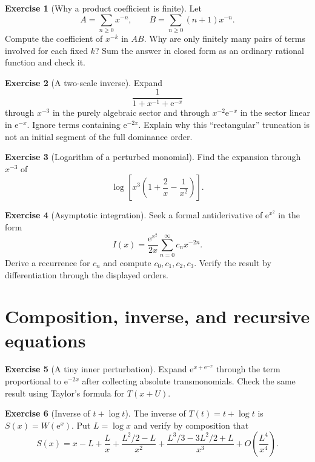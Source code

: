 \documentclass[11pt,oneside]{book}
\theoremstyle{definition}
\newtheorem{exercise}{Exercise}[chapter]
\theoremstyle{remark}
\newcommand{\e}{\mathrm{e}}
\newcommand{\bigO}{O}
\begin{document}
\begin{exercise}[Why a product coefficient is finite]
\label{ex:finite-product}
Let
\[
  A=\sum_{n\ge0}x^{-n},
  \qquad B=\sum_{n\ge0}(n+1)x^{-n}.
\]
Compute the coefficient of $x^{-k}$ in $AB$. Why are only finitely many pairs of
terms involved for each fixed $k$? Sum the answer in closed form as an ordinary
rational function and check it.
\end{exercise}

\begin{exercise}[A two-scale inverse]
\label{ex:two-scale-inverse}
Expand
\[
  \frac1{1+x^{-1}+\e^{-x}}
\]
through $x^{-3}$ in the purely algebraic sector and through
$x^{-2}\e^{-x}$ in the sector linear in $\e^{-x}$. Ignore terms containing
$\e^{-2x}$. Explain why this ``rectangular'' truncation is not an initial segment
of the full dominance order.
\end{exercise}

\begin{exercise}[Logarithm of a perturbed monomial]
\label{ex:log-perturbed}
Find the expansion through $x^{-3}$ of
\[
  \log\!\left[x^3\left(1+\frac2x-\frac1{x^2}\right)\right].
\]
\end{exercise}

\begin{exercise}[Asymptotic integration]
\label{ex:integrate-exp-x2}
Seek a formal antiderivative of $\e^{x^2}$ in the form
\[
  I(x)=\frac{\e^{x^2}}{2x}
  \sum_{n=0}^{\infty}c_nx^{-2n}.
\]
Derive a recurrence for $c_n$ and compute $c_0,c_1,c_2,c_3$. Verify the result by
differentiation through the displayed orders.
\end{exercise}

\section{Composition, inverse, and recursive equations}

\begin{exercise}[A tiny inner perturbation]
\label{ex:tiny-composition}
Expand $\e^{x+\e^{-x}}$ through the term proportional to $\e^{-2x}$ after
collecting absolute transmonomials. Check the same result using Taylor's formula
for $T(x+U)$.
\end{exercise}

\begin{exercise}[Inverse of $t+\log t$]
\label{ex:inverse-t-log-t}
The inverse of $T(t)=t+\log t$ is $S(x)=W(\e^x)$. Put $L=\log x$ and verify by
composition that
\[
  S(x)=x-L+\frac{L}{x}
   +\frac{L^2/2-L}{x^2}
   +\frac{L^3/3-3L^2/2+L}{x^3}
   +\bigO\!\left(\frac{L^4}{x^4}\right).
\]
\end{exercise}
\end{document}
